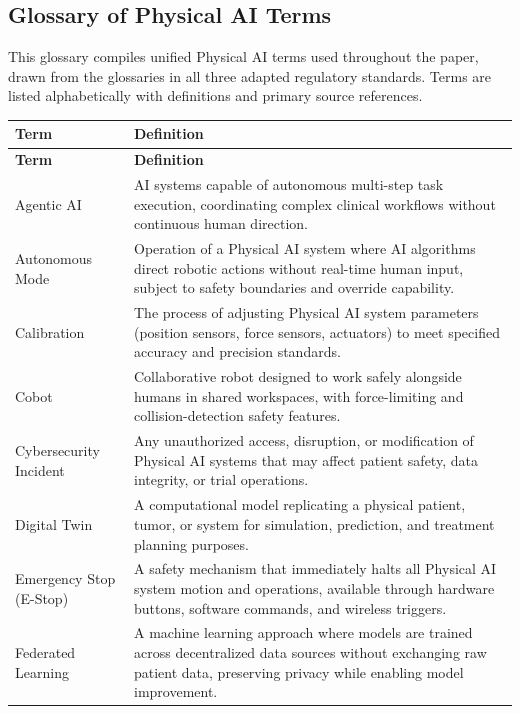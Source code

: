 \newpage

\subsection{Glossary of Physical AI Terms}
\label{app:glossary}

This glossary compiles unified Physical AI terms used throughout the paper,
drawn from the glossaries in all three adapted regulatory standards. Terms are
listed alphabetically with definitions and primary source references.

\begin{longtable}{>{\raggedright\arraybackslash}p{4.5cm} >{\raggedright\arraybackslash}p{11cm}}
\toprule
\textbf{Term} & \textbf{Definition} \\
\midrule
\endfirsthead
\toprule
\textbf{Term} & \textbf{Definition} \\
\midrule
\endhead
\bottomrule
\endfoot
Agentic AI & AI systems capable of autonomous multi-step task execution, coordinating complex clinical workflows without continuous human direction. \\
Autonomous Mode & Operation of a Physical AI system where AI algorithms direct robotic actions without real-time human input, subject to safety boundaries and override capability. \\
Calibration & The process of adjusting Physical AI system parameters (position sensors, force sensors, actuators) to meet specified accuracy and precision standards. \\
Cobot & Collaborative robot designed to work safely alongside humans in shared workspaces, with force-limiting and collision-detection safety features. \\
Cybersecurity Incident & Any unauthorized access, disruption, or modification of Physical AI systems that may affect patient safety, data integrity, or trial operations. \\
Digital Twin & A computational model replicating a physical patient, tumor, or system for simulation, prediction, and treatment planning purposes. \\
Emergency Stop (E-Stop) & A safety mechanism that immediately halts all Physical AI system motion and operations, available through hardware buttons, software commands, and wireless triggers. \\
Federated Learning & A machine learning approach where models are trained across decentralized data sources without exchanging raw patient data, preserving privacy while enabling model improvement. \\

\end{longtable}
